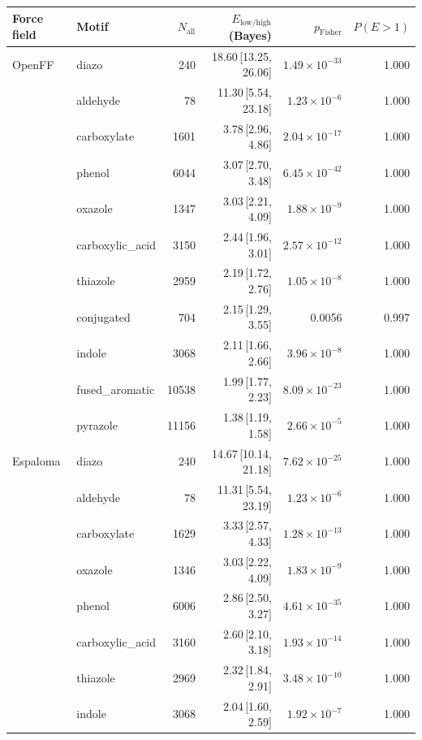 \begin{table}[t]
  \centering
  \small
  \setlength{\tabcolsep}{6pt}
  \renewcommand{\arraystretch}{1.15}
  \begin{tabular}{llrrrr}
    \hline
    Force field & Motif & $N_\mathrm{all}$ & $E_{\mathrm{low/high}}$ (Bayes) & $p_\mathrm{Fisher}$ & $P(E>1)$ \\
    \hline
    OpenFF & diazo & 240 & 18.60\,[13.25, 26.06] & $1.49\times 10^{-33}$ & 1.000 \\
      & aldehyde & 78 & 11.30\,[5.54, 23.18] & $1.23\times 10^{-6}$ & 1.000 \\
      & carboxylate & 1601 & 3.78\,[2.96, 4.86] & $2.04\times 10^{-17}$ & 1.000 \\
      & phenol & 6044 & 3.07\,[2.70, 3.48] & $6.45\times 10^{-42}$ & 1.000 \\
      & oxazole & 1347 & 3.03\,[2.21, 4.09] & $1.88\times 10^{-9}$ & 1.000 \\
      & carboxylic\_acid & 3150 & 2.44\,[1.96, 3.01] & $2.57\times 10^{-12}$ & 1.000 \\
      & thiazole & 2959 & 2.19\,[1.72, 2.76] & $1.05\times 10^{-8}$ & 1.000 \\
      & conjugated & 704 & 2.15\,[1.29, 3.55] & 0.0056 & 0.997 \\
      & indole & 3068 & 2.11\,[1.66, 2.66] & $3.96\times 10^{-8}$ & 1.000 \\
      & fused\_aromatic & 10538 & 1.99\,[1.77, 2.23] & $8.09\times 10^{-23}$ & 1.000 \\
      & pyrazole & 11156 & 1.38\,[1.19, 1.58] & $2.66\times 10^{-5}$ & 1.000 \\
    \hline
    Espaloma & diazo & 240 & 14.67\,[10.14, 21.18] & $7.62\times 10^{-25}$ & 1.000 \\
      & aldehyde & 78 & 11.31\,[5.54, 23.19] & $1.23\times 10^{-6}$ & 1.000 \\
      & carboxylate & 1629 & 3.33\,[2.57, 4.33] & $1.28\times 10^{-13}$ & 1.000 \\
      & oxazole & 1346 & 3.03\,[2.22, 4.09] & $1.83\times 10^{-9}$ & 1.000 \\
      & phenol & 6006 & 2.86\,[2.50, 3.27] & $4.61\times 10^{-35}$ & 1.000 \\
      & carboxylic\_acid & 3160 & 2.60\,[2.10, 3.18] & $1.93\times 10^{-14}$ & 1.000 \\
      & thiazole & 2969 & 2.32\,[1.84, 2.91] & $3.48\times 10^{-10}$ & 1.000 \\
      & indole & 3068 & 2.04\,[1.60, 2.59] & $1.92\times 10^{-7}$ & 1.000 \\

\end{tabular}
\end{table}
